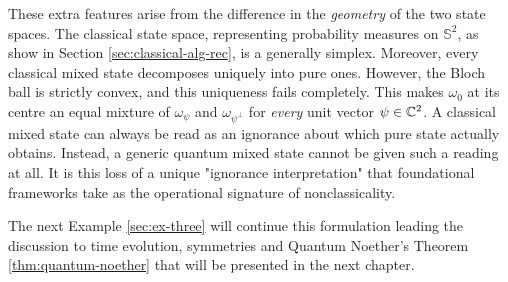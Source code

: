 	These extra features arise from the difference in the \emph{geometry} of the two state spaces. The classical state space, representing probability measures on $\mathbb S^2$, as show in Section \ref{sec:classical-alg-rec}, is a generally simplex. Moreover, every classical mixed state decomposes uniquely into pure ones. However, the Bloch ball is strictly convex, and this uniqueness fails completely. This makes $\omega_0$ at its centre an equal mixture of $\omega_\psi$ and $\omega_{\psi^\perp}$ for \emph{every} unit vector $\psi\in\mathbb{C}^2$. A classical mixed state can always be read as an ignorance about which pure state actually obtains. Instead, a generic quantum mixed state cannot be given such a reading at all. It is this loss of a unique "ignorance interpretation" that foundational frameworks take as the operational signature of nonclassicality. 
	
	The next Example \ref{sec:ex-three} will continue this formulation leading the discussion to time evolution, symmetries and Quantum Noether's Theorem \ref{thm:quantum-noether} that will be presented in the next chapter.
